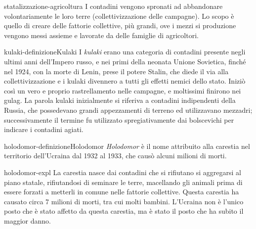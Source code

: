\documentclass[preview]{standalone}
\begin{document}
\begin{snippet}{statalizzazione-agricoltura}
    I contadini vengono spronati ad abbandonare volontariamente le loro terre
    (collettivizzazione delle campagne).
    Lo scopo è quello di creare delle fattorie collettive, più grandi,
    ove i mezzi si produzione vengono messi assieme e lavorate da delle famiglie
    di agricoltori.
\end{snippet}

\begin{snippetdefinition}{kulaki-definizione}{Kulaki}
    I \textit{kulaki} erano una categoria di contadini
    presente negli ultimi anni dell'Impero russo, e nei primi
    della neonata Unione Sovietica, finché nel 1924,
    con la morte di Lenin, prese il potere Stalin, che diede il
    via alla collettivizzazione e i kulaki divennero a tutti gli effetti
    nemici dello stato. Iniziò così un vero e proprio rastrellamento nelle
    campagne, e moltissimi finirono nei gulag.
    La parola kulaki inizialmente si riferiva a contadini indipendenti
    della Russia, che possedevano grandi appezzamenti di terreno ed
    utilizzavano mezzadri; successivamente il termine fu utilizzato
    spregiativamente dai bolscevichi per indicare i contadini agiati. 
\end{snippetdefinition}

\begin{snippetdefinition}{holodomor-definizione}{Holodomor}
    \textit{Holodomor} è il nome attribuito alla carestia nel territorio dell'Ucraina dal 1932 al 1933, che causò alcuni milioni di morti.
\end{snippetdefinition}

\begin{snippet}{holodomor-expl}
    La carestia nasce dai contadini che si rifiutano si aggregarsi al piano statale,
    rifiutandosi di seminare le terre, macellando gli animali prima
    di essere forzati a metterli in comune nelle fattorie collettive.
    Questa carestia ha causato circa 7 milioni di morti, tra cui molti bambini.
    L'Ucraina non è l'unico posto che è stato affetto da questa carestia,
    ma è stato il posto che ha subito il maggior danno.
\end{snippet}


\end{document}
